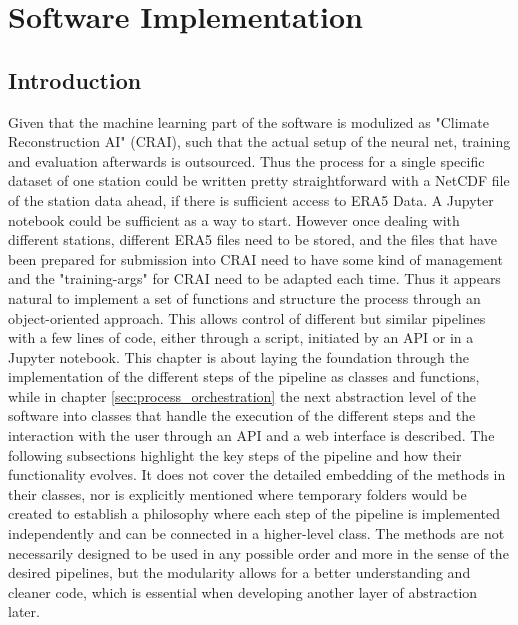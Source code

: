 \section{Software Implementation}
\label{sec:implementation}

\subsection{Introduction}

Given that the machine learning part of the software is modulized as "Climate Reconstruction AI" (CRAI), such that the actual setup of the neural net, training and evaluation afterwards is outsourced. Thus the process for a single specific dataset of one station could be written pretty straightforward with a NetCDF file of the station data ahead, if there is sufficient access to ERA5 Data. A Jupyter notebook could be sufficient as a way to start. However once dealing with different stations, different ERA5 files need to be stored, and the files that have been prepared for submission into CRAI need to have some kind of management and the "training-args" for CRAI need to be adapted each time. Thus it appears natural to implement a set of functions and structure the process through an object-oriented approach. This allows control of different but similar pipelines with a few lines of code, either through a script, initiated by an API or in a Jupyter notebook.
This chapter is about laying the foundation through the implementation of the different steps of the pipeline as classes and functions, while in chapter \autoref{sec:process_orchestration} the next abstraction level of the software into classes that handle the execution of the different steps and the interaction with the user through an API and a web interface is described.
The following subsections highlight the key steps of the pipeline and how their functionality evolves. It does not cover the detailed embedding of the methods in their classes, nor is explicitly mentioned where temporary folders would be created to establish a philosophy where each step of the pipeline is implemented independently and can be connected in a higher-level class. The methods are not necessarily designed to be used in any possible order and more in the sense of the desired pipelines, but the modularity allows for a better understanding and cleaner code, which is essential when developing another layer of abstraction later.

